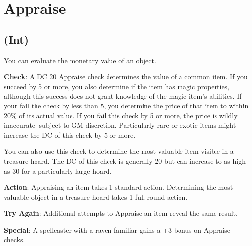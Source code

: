 \section{Appraise}

\label{f0}
\subsection{(Int)}

				
You can evaluate the monetary value of an object.
				
\textbf{Check}: A DC 20 Appraise check determines the value of a common item. If you succeed by 5 or more, you also determine if the item has magic properties, although this success does not grant knowledge of the magic item's abilities. If your fail the check by less than 5, you determine the price of that item to within 20\% of its actual value. If you fail this check by 5 or more, the price is wildly inaccurate, subject to GM discretion. Particularly rare or exotic items might increase the DC of this check by 5 or more.
				
You can also use this check to determine the most valuable item visible in a treasure hoard. The DC of this check is generally 20 but can increase to as high as 30 for a particularly large hoard.
				
\textbf{Action}: Appraising an item takes 1 standard action. Determining the most valuable object in a treasure hoard takes 1 full-round action.
				
\textbf{Try Again}: Additional attempts to Appraise an item reveal the same result.
				
\textbf{Special}: A spellcaster with a raven familiar gains a +3 bonus on Appraise checks.
        	

